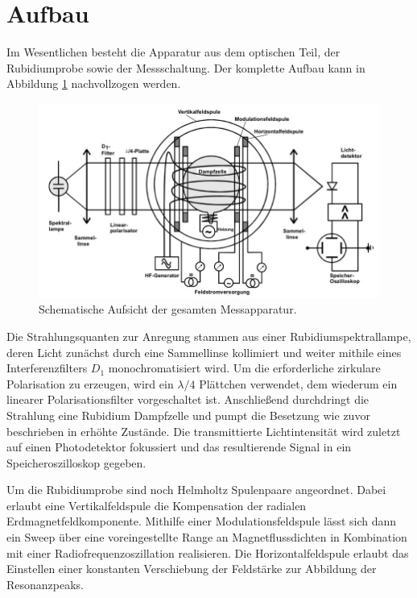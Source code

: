 \section{Aufbau}
\label{sec:Aufbau}

Im Wesentlichen besteht die Apparatur aus dem optischen Teil, der Rubidiumprobe sowie der Messschaltung. Der komplette Aufbau
kann in Abbildung \ref{fig:aufbau} nachvollzogen werden.

\begin{figure}[H]
	\centering
	\includegraphics[width=0.8\linewidth]{content/grafik/aufbau.jpg}
	\caption{Schematische Aufsicht der gesamten Messapparatur. \cite{pumpen}}
	\label{fig:aufbau}
\end{figure}

Die Strahlungsquanten zur Anregung stammen aus einer Rubidiumspektrallampe, deren Licht zunächst durch eine Sammellinse kollimiert
und weiter mithile eines Interferenzfilters $D_1$ monochromatisiert wird. Um die erforderliche zirkulare Polarisation zu
erzeugen, wird ein $\lambda/4$ Plättchen verwendet, dem wiederum ein linearer Polarisationsfilter vorgeschaltet ist. Anschließend
durchdringt die Strahlung eine Rubidium Dampfzelle und pumpt die Besetzung wie zuvor beschrieben in erhöhte Zustände. Die
transmittierte Lichtintensität wird zuletzt auf einen Photodetektor fokussiert und das resultierende Signal in ein
Speicheroszilloskop gegeben. 

Um die Rubidiumprobe sind noch Helmholtz Spulenpaare angeordnet. Dabei erlaubt eine Vertikalfeldspule die Kompensation
der radialen Erdmagnetfeldkomponente. Mithilfe einer Modulationsfeldspule lässt sich dann ein Sweep über eine voreingestellte
Range an Magnetflussdichten in Kombination mit einer Radiofrequenzoszillation realisieren. Die Horizontalfeldspule erlaubt
das Einstellen einer konstanten Verschiebung der Feldstärke zur Abbildung der Resonanzpeaks.
